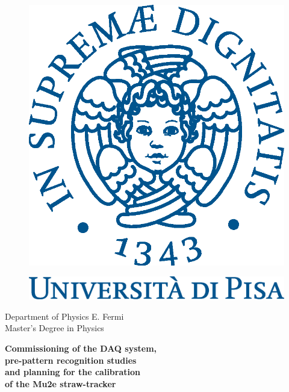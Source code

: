 \begin{titlepage}
    \begin{center}
\begin{figure}[!htb]
    \centering
    \includegraphics[keepaspectratio=true,scale=0.4]{figures/eps/cherubinFrontespizio.eps}
\end{figure}
\begin{figure}[!htb]
    \centering
    \includegraphics[keepaspectratio=true,scale=0.45]{figures/eps/logo_pant541.eps}
\end{figure}

    \Large{Department of Physics E. Fermi}
    \vspace{5mm}
    \\ 
    \Large{Master's Degree in Physics}
\end{center}

\vspace{15mm}
\begin{center}
  {\LARGE{\bf Commissioning of the DAQ system,\\ \vspace{3mm} pre-pattern recognition studies\\ \vspace{5mm}and planning for the calibration \\ \vspace{7mm}of the Mu2e straw-tracker}}


\end{center}
\end{titlepage}
